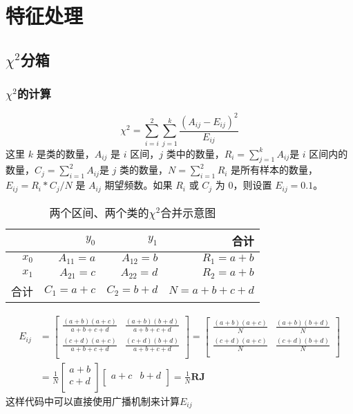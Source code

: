 \chapter{特征处理}
\section{$\chi^2$分箱}
\subsection{$\chi^2$的计算}
\begin{equation}
    \chi^2=\sum_{i=i}^{2}\sum_{j=1}^{k}\frac{(A_{ij}-E_{ij})^2}{E_{ij}}
\end{equation}
这里 $k$ 是类的数量，$A_{ij}$ 是 $i$ 区间，$j$ 类中的数量，$R_i=\sum_{j=1}^{k}A_{ij}$是 $i$ 区间内的数量，$C_j=\sum_{i=1}^{2}A_{ij}$是 $j$ 类的数量，$N=\sum_{i=1}^{2}R_i$ 是所有样本的数量，$E_{ij}=R_i*C_j/N$ 是 $A_{ij}$ 期望频数。如果 $R_i$ 或 $C_j$ 为 0，则设置 $E_{ij}=0.1$。

\begin{table}
    \centering
    \caption{两个区间、两个类的$\chi^2$合并示意图}
    \begin{tabular}{rrrr}
        \hline
              & $y_0$      & $y_1$      & 合计          \\
        \hline
        $x_0$ & $A_{11}=a$ & $A_{12}=b$ & $R_1=a+b$   \\
        $x_1$ & $A_{21}=c$ & $A_{22}=d$ & $R_2=a+b$   \\
        合计    & $C_1=a+c$  & $C_2=b+d$  & $N=a+b+c+d$ \\
        \hline
    \end{tabular}
\end{table}
\begin{equation}
    \begin{aligned}
        E_{ij} & =
        \begin{bmatrix}
            \frac{(a+b)(a+c)}{a+b+c+d} & \frac{(a+b)(b+d)}{a+b+c+d} \\
            \frac{(c+d)(a+c)}{a+b+c+d} & \frac{(c+d)(b+d)}{a+b+c+d} \\
        \end{bmatrix}=\begin{bmatrix}
                          \frac{(a+b)(a+c)}{N} & \frac{(a+b)(b+d)}{N} \\
                          \frac{(c+d)(a+c)}{N} & \frac{(c+d)(b+d)}{N} \\
                      \end{bmatrix} \\
               & =\frac{1}{N}
        \begin{bmatrix}
            a+b \\
            c+d \\
        \end{bmatrix}
        \begin{bmatrix}
            a+c & b+d \\
        \end{bmatrix}=\frac{1}{N}\bm{R}\bm{J}
    \end{aligned}
\end{equation}
这样代码中可以直接使用广播机制来计算$E_{ij}$